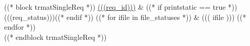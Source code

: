 ((* block trmatSingleReq *))
\hyperref[(((req_id)))]{(((req_id)))} \label{trmat:(((req_id)))} & %
((* if printstatic == true *))(((req_status)))((* endif *)) %
((* for ifile in file_statuses *)) & ((( ifile ))) ((* endfor *)) %
 \\
((* endblock trmatSingleReq *))
